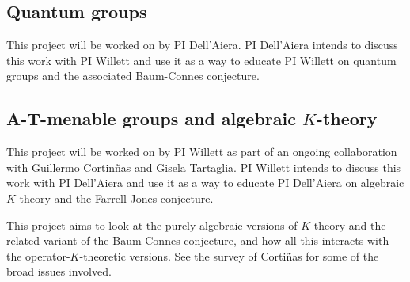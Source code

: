 \documentclass[11pt]{article}
\theoremstyle{plain}
\newtheorem{project}[theorem]{Project}
\theoremstyle{definition}
\theoremstyle{remark}
\begin{document}






 
 
 \subsection{Quantum groups}     
 
This project will be worked on by PI Dell'Aiera.  PI Dell'Aiera intends to discuss this work with PI Willett and use it as a way to educate PI Willett on quantum groups and the associated Baum-Connes conjecture.
 
%
%



\subsection{A-T-menable groups and algebraic $K$-theory}\label{atmen}



This project will be worked on by PI Willett as part of an ongoing collaboration with Guillermo Cortin\~{n}as and Gisela Tartaglia.  PI Willett intends to discuss this work with PI Dell'Aiera and use it as a way to educate PI Dell'Aiera on algebraic $K$-theory and the Farrell-Jones conjecture.

This project aims to look at the purely algebraic versions of $K$-theory and the related variant of the Baum-Connes conjecture, and how all this interacts with the operator-$K$-theoretic versions.  See the survey \cite{Cortinas:2008aa} of Corti\~{n}as for some of the broad issues involved.
\end{document}
